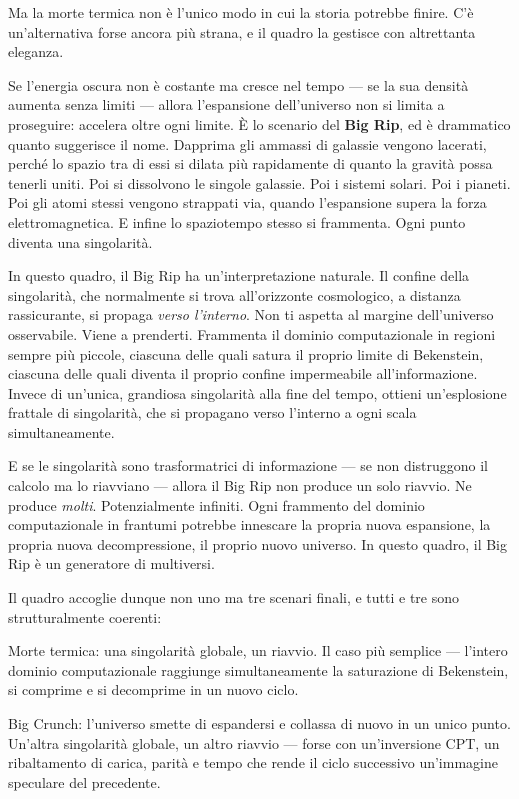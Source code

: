 \documentclass[11pt, twoside, openright]{book}
\begin{document}
Ma la morte termica non è l'unico modo in cui la storia potrebbe finire. C'è un'alternativa forse ancora più strana, e il quadro la gestisce con altrettanta eleganza.

Se l'energia oscura non è costante ma cresce nel tempo --- se la sua densità aumenta senza limiti --- allora l'espansione dell'universo non si limita a proseguire: accelera oltre ogni limite. È lo scenario del \textbf{Big Rip}, ed è drammatico quanto suggerisce il nome. Dapprima gli ammassi di galassie vengono lacerati, perché lo spazio tra di essi si dilata più rapidamente di quanto la gravità possa tenerli uniti. Poi si dissolvono le singole galassie. Poi i sistemi solari. Poi i pianeti. Poi gli atomi stessi vengono strappati via, quando l'espansione supera la forza elettromagnetica. E infine lo spaziotempo stesso si frammenta. Ogni punto diventa una singolarità.

In questo quadro, il Big Rip ha un'interpretazione naturale. Il confine della singolarità, che normalmente si trova all'orizzonte cosmologico, a distanza rassicurante, si propaga \textit{verso l'interno}. Non ti aspetta al margine dell'universo osservabile. Viene a prenderti. Frammenta il dominio computazionale in regioni sempre più piccole, ciascuna delle quali satura il proprio limite di Bekenstein, ciascuna delle quali diventa il proprio confine impermeabile all'informazione. Invece di un'unica, grandiosa singolarità alla fine del tempo, ottieni un'esplosione frattale di singolarità, che si propagano verso l'interno a ogni scala simultaneamente.

E se le singolarità sono trasformatrici di informazione --- se non distruggono il calcolo ma lo riavviano --- allora il Big Rip non produce un solo riavvio. Ne produce \textit{molti}. Potenzialmente infiniti. Ogni frammento del dominio computazionale in frantumi potrebbe innescare la propria nuova espansione, la propria nuova decompressione, il proprio nuovo universo. In questo quadro, il Big Rip è un generatore di multiversi.

Il quadro accoglie dunque non uno ma tre scenari finali, e tutti e tre sono strutturalmente coerenti:

Morte termica: una singolarità globale, un riavvio. Il caso più semplice --- l'intero dominio computazionale raggiunge simultaneamente la saturazione di Bekenstein, si comprime e si decomprime in un nuovo ciclo.

Big Crunch: l'universo smette di espandersi e collassa di nuovo in un unico punto. Un'altra singolarità globale, un altro riavvio --- forse con un'inversione CPT, un ribaltamento di carica, parità e tempo che rende il ciclo successivo un'immagine speculare del precedente.
\end{document}
